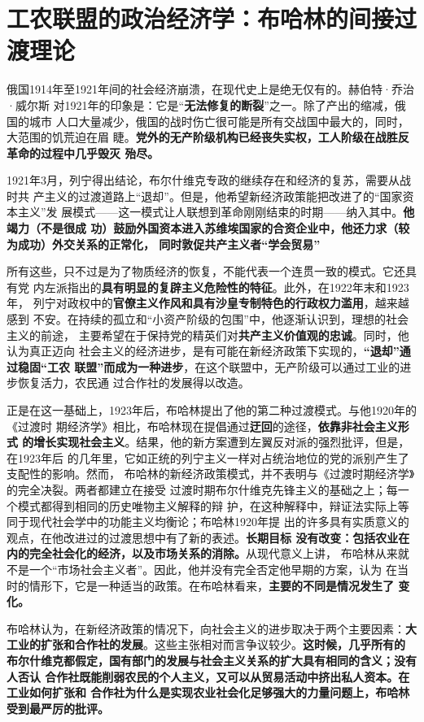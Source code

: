 \section{工农联盟的政治经济学：布哈林的间接过渡理论}

俄国1914年至1921年间的社会经济崩溃，在现代史上是绝无仅有的。赫伯特·乔治·威尔斯
对1921年的印象是：它是“\textbf{无法修复的断裂}”之一。除了产出的缩减，俄国的城市
人口大量减少，俄国的战时伤亡很可能是所有交战国中最大的，同时，大范围的饥荒迫在眉
睫。\textbf{党外的无产阶级机构已经丧失实权，工人阶级在战胜反革命的过程中几乎毁灭
  殆尽。}

1921年3月，列宁得出结论，布尔什维克专政的继续存在和经济的复苏，需要从战时共
产主义的过渡道路上“退却”。但是，他希望新经济政策能把改进了的“国家资本主义”发
展模式——这一模式让人联想到革命刚刚结束的时期——纳入其中。\textbf{他竭力（不是很成
功）鼓励外国资本进入苏维埃国家的合资企业中，他还力求（较为成功）外交关系的正常化，
同时敦促共产主义者“学会贸易”}

所有这些，只不过是为了物质经济的恢复，不能代表一个连贯一致的模式。它还具有党
内左派指出的\textbf{具有明显的复辟主义危险性的特征}。此外，在1922年末和1923年，
列宁对政权中的\textbf{官僚主义作风和具有沙皇专制特色的行政权力滥用}，越来越感到
不安。在持续的孤立和“小资产阶级的包围”中，他逐渐认识到，理想的社会主义的前途，
主要希望在于保持党的精英们对\textbf{共产主义价值观的忠诚}。同时，他认为真正迈向
社会主义的经济进步，是有可能在新经济政策下实现的，\textbf{“退却”通过稳固“工农
联盟”而成为一种进步}，在这个联盟中，无产阶级可以通过工业的进步恢复活力，农民通
过合作社的发展得以改造。

正是在这一基础上，1923年后，布哈林提出了他的第二种过渡模式。与他1920年的《过渡时
期经济学》相比，布哈林现在提倡通过\textbf{迂回}的途径，\textbf{依靠非社会主义形式
  的增长实现社会主义}。结果，他的新方案遭到左翼反对派的强烈批评，但是，在1923年后
的几年里，它如正统的列宁主义一样对占统治地位的党的派别产生了支配性的影响。然而，
布哈林的新经济政策模式，并不表明与《过渡时期经济学》的完全决裂。两者都建立在接受
过渡时期布尔什维克先锋主义的基础之上；每一个模式都得到相同的历史唯物主义解释的辩
护，在这种解释中，辩证法实际上等同于现代社会学中的功能主义均衡论；布哈林1920年提
出的许多具有实质意义的观点，在他改进过的过渡思想中有了新的表述。\textbf{长期目标
  没有改变：包括农业在内的完全社会化的经济，以及市场关系的消除。}从现代意义上讲，
布哈林从来就不是一个“市场社会主义者”。因此，他并没有完全否定他早期的方案，认为
在当时的情形下，它是一种适当的政策。在布哈林看来，\textbf{主要的不同是情况发生了
  变化。}

布哈林认为，在新经济政策的情况下，向社会主义的进步取决于两个主要因素：\textbf{大
  工业的扩张和合作社的发展}。这些主张相对而言争议较少。\textbf{这时候，几乎所有的
  布尔什维克都假定，国有部门的发展与社会主义关系的扩大具有相同的含义；没有人否认
  合作社既能削弱农民的个人主义，又可以从贸易活动中挤出私人资本。在工业如何扩张和
  合作社为什么是实现农业社会化足够强大的力量问题上，布哈林受到最严厉的批评。}

